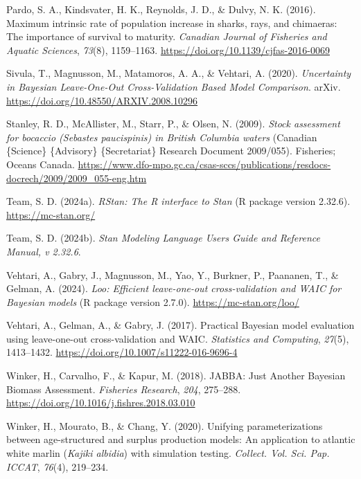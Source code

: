 \documentclass[
  11pt,
]{SCreport}
\newlength{\cslhangindent}
\newenvironment{CSLReferences}[2] %
 {\begin{list}{}{%
  \setlength{\itemindent}{0pt}
  \setlength{\leftmargin}{0pt}
  \setlength{\parsep}{0pt}
  \ifodd #1
   \setlength{\leftmargin}{\cslhangindent}
   \setlength{\itemindent}{-1\cslhangindent}
  \fi
  \setlength{\itemsep}{#2\baselineskip}}}
 {\end{list}}
\begin{document}
\begin{CSLReferences}{1}{0}
Pardo, S. A., Kindsvater, H. K., Reynolds, J. D., \& Dulvy, N. K.
(2016). Maximum intrinsic rate of population increase in sharks, rays,
and chimaeras: The importance of survival to maturity. \emph{Canadian
Journal of Fisheries and Aquatic Sciences}, \emph{73}(8), 1159--1163.
\url{https://doi.org/10.1139/cjfas-2016-0069}

Sivula, T., Magnusson, M., Matamoros, A. A., \& Vehtari, A. (2020).
\emph{Uncertainty in {Bayesian} {Leave}-{One}-{Out} {Cross}-{Validation}
{Based} {Model} {Comparison}}. arXiv.
\url{https://doi.org/10.48550/ARXIV.2008.10296}

Stanley, R. D., McAllister, M., Starr, P., \& Olsen, N. (2009).
\emph{Stock assessment for bocaccio (\emph{{Sebastes} paucispinis}) in
{British} {Columbia} waters} (Canadian \{Science\} \{Advisory\}
\{Secretariat\} Research Document 2009/055). Fisheries; Oceans Canada.
\url{https://www.dfo-mpo.gc.ca/csas-sccs/publications/resdocs-docrech/2009/2009_055-eng.htm}

Team, S. D. (2024a). \emph{{RStan}: The {R} interface to {Stan}} (R
package version 2.32.6). \url{https://mc-stan.org/}

Team, S. D. (2024b). \emph{Stan {Modeling} {Language} {Users} {Guide}
and {Reference} {Manual}, v 2.32.6}.

Vehtari, A., Gabry, J., Magnusson, M., Yao, Y., Burkner, P., Paananen,
T., \& Gelman, A. (2024). \emph{Loo: {Efficient} leave-one-out
cross-validation and {WAIC} for {Bayesian} models} (R package version
2.7.0). \url{https://mc-stan.org/loo/}

Vehtari, A., Gelman, A., \& Gabry, J. (2017). Practical {Bayesian} model
evaluation using leave-one-out cross-validation and {WAIC}.
\emph{Statistics and Computing}, \emph{27}(5), 1413--1432.
\url{https://doi.org/10.1007/s11222-016-9696-4}

Winker, H., Carvalho, F., \& Kapur, M. (2018). {JABBA}: {Just} {Another}
{Bayesian} {Biomass} {Assessment}. \emph{Fisheries Research},
\emph{204}, 275--288.
\url{https://doi.org/10.1016/j.fishres.2018.03.010}

Winker, H., Mourato, B., \& Chang, Y. (2020). Unifying parameterizations
between age-structured and surplus production models: {An} application
to atlantic white marlin (\emph{{Kajiki} albidia}) with simulation
testing. \emph{Collect. Vol. Sci. Pap. ICCAT}, \emph{76}(4), 219--234.

\end{CSLReferences}
\end{document}

